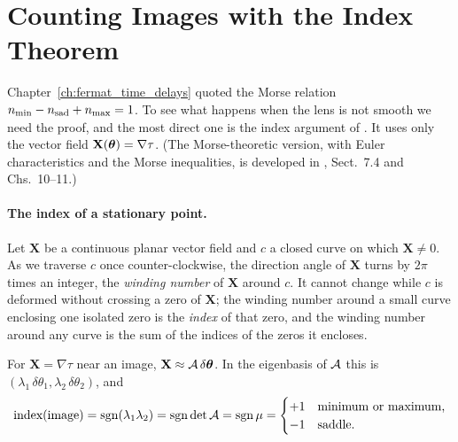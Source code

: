 \section{Counting Images with the Index Theorem}
\label{sec:oi_counting}

Chapter~\ref{ch:fermat_time_delays} quoted the Morse relation
$n_{\min}-n_{\rm sad}+n_{\max}=1$.  To see what happens when the lens
is not smooth we need the proof, and the most direct one is the
index argument of \citet[][Sect.~5.4.1]{schneider_ehlers_falco_1992}.
It uses only the vector field $\mathbf X(\boldsymbol{\theta})=\nabla\tau$.
(The Morse-theoretic version, with Euler characteristics and the Morse
inequalities, is developed in \citealt{petters_singularity_2001},
Sect.~7.4 and Chs.~10--11.)

\paragraph{The index of a stationary point.}
Let $\mathbf X$ be a continuous planar vector field and $c$ a closed
curve on which $\mathbf X\neq 0$.  As we traverse $c$ once
counter-clockwise, the direction angle of $\mathbf X$ turns by $2\pi$
times an integer, the \emph{winding number} of $\mathbf X$ around $c$.
It cannot change while $c$ is deformed without crossing a zero of
$\mathbf X$; the winding number around a small curve enclosing one
isolated zero is the \emph{index} of that zero, and the winding number
around any curve is the sum of the indices of the zeros it encloses.

For $\mathbf X=\nabla\tau$ near an image, $\mathbf X\approx\mathcal{A}\,\delta\boldsymbol{\theta}$.
In the eigenbasis of $\mathcal{A}$ this is $(\lambda_1\,\delta\theta_1,\lambda_2\,\delta\theta_2)$, and
\begin{equation}
    \text{index}(\text{image}) = \operatorname{sgn}(\lambda_1\lambda_2)
    = \operatorname{sgn}\det\mathcal{A} = \operatorname{sgn}\mu
    = \begin{cases} +1 & \text{minimum or maximum,}\\ -1 & \text{saddle.}\end{cases}
    \label{eq:oi_index}
\end{equation}

